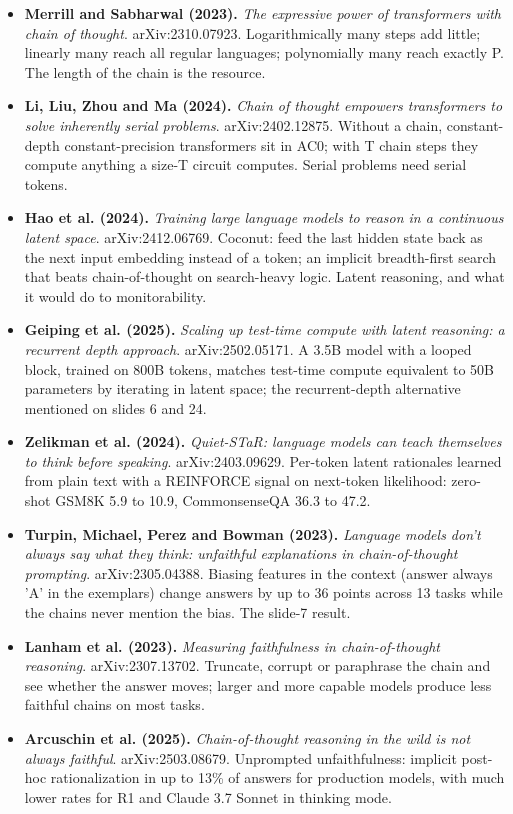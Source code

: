 \documentclass[11pt,letterpaper]{article}
\begin{document}
\begin{itemize}[leftmargin=1.2em,itemsep=3pt]
\item \textbf{Merrill and Sabharwal (2023).} \textit{The expressive power of transformers with chain of thought}. arXiv:2310.07923. Logarithmically many steps add little; linearly many reach all regular languages; polynomially many reach exactly P. The length of the chain is the resource.
\item \textbf{Li, Liu, Zhou and Ma (2024).} \textit{Chain of thought empowers transformers to solve inherently serial problems}. arXiv:2402.12875. Without a chain, constant-depth constant-precision transformers sit in AC0; with T chain steps they compute anything a size-T circuit computes. Serial problems need serial tokens.
\item \textbf{Hao et al. (2024).} \textit{Training large language models to reason in a continuous latent space}. arXiv:2412.06769. Coconut: feed the last hidden state back as the next input embedding instead of a token; an implicit breadth-first search that beats chain-of-thought on search-heavy logic. Latent reasoning, and what it would do to monitorability.
\item \textbf{Geiping et al. (2025).} \textit{Scaling up test-time compute with latent reasoning: a recurrent depth approach}. arXiv:2502.05171. A 3.5B model with a looped block, trained on 800B tokens, matches test-time compute equivalent to 50B parameters by iterating in latent space; the recurrent-depth alternative mentioned on slides 6 and 24.
\item \textbf{Zelikman et al. (2024).} \textit{Quiet-STaR: language models can teach themselves to think before speaking}. arXiv:2403.09629. Per-token latent rationales learned from plain text with a REINFORCE signal on next-token likelihood: zero-shot GSM8K 5.9 to 10.9, CommonsenseQA 36.3 to 47.2.
\item \textbf{Turpin, Michael, Perez and Bowman (2023).} \textit{Language models don't always say what they think: unfaithful explanations in chain-of-thought prompting}. arXiv:2305.04388. Biasing features in the context (answer always 'A' in the exemplars) change answers by up to 36 points across 13 tasks while the chains never mention the bias. The slide-7 result.
\item \textbf{Lanham et al. (2023).} \textit{Measuring faithfulness in chain-of-thought reasoning}. arXiv:2307.13702. Truncate, corrupt or paraphrase the chain and see whether the answer moves; larger and more capable models produce less faithful chains on most tasks.
\item \textbf{Arcuschin et al. (2025).} \textit{Chain-of-thought reasoning in the wild is not always faithful}. arXiv:2503.08679. Unprompted unfaithfulness: implicit post-hoc rationalization in up to 13\% of answers for production models, with much lower rates for R1 and Claude 3.7 Sonnet in thinking mode.

\end{itemize}
\end{document}
